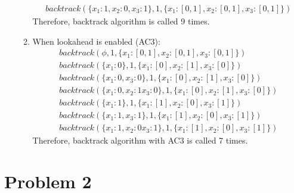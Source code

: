 \documentclass[12pt]{article}
\begin{document}
\begin{enumerate}[label=(\alph*)]
\begin{enumerate}[label=\roman*.]
\begin{align*}
  backtrack(\{x_1: 1, x_2: 0, x_3: 1\}, 1, \{x_1: [0, 1], x_2: [0, 1], x_3: [0,1]\})
  \end{align*}
  Therefore, backtrack algorithm is called 9 times.
  \item When lookahead is enabled (AC3):
  \begin{align*}
  backtrack(\phi, 1, \{x_1: [0, 1], x_2: [0, 1], x_3: [0,1]\}) \\
  backtrack(\{x_1: 0\}, 1, \{x_1: [0], x_2: [1], x_3: [0]\}) \\
  backtrack(\{x_1: 0, x_3: 0\}, 1, \{x_1: [0], x_2: [1], x_3: [0]\}) \\
  backtrack(\{x_1: 0, x_2: 1 x_3: 0\}, 1, \{x_1: [0], x_2: [1], x_3: [0]\}) \\
  backtrack(\{x_1: 1\}, 1, \{x_1: [1], x_2: [0], x_3: [1]\}) \\
  backtrack(\{x_1: 1, x_3: 1\}, 1, \{x_1: [1], x_2: [0], x_3: [1]\}) \\
  backtrack(\{x_1: 1, x_2: 0 x_3: 1\}, 1, \{x_1: [1], x_2: [0], x_3: [1]\})
  \end{align*}
  Therefore, backtrack algorithm with AC3 is called 7 times.
\end{enumerate}
\end{enumerate}
\section*{Problem 2}
\end{document}
